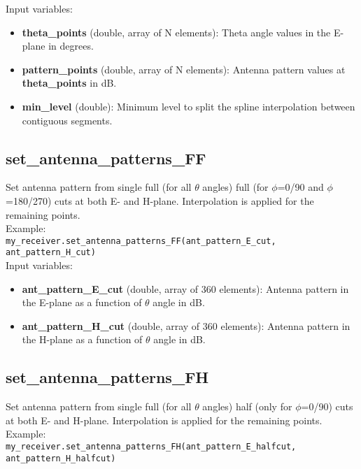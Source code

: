Input variables:
\begin{itemize}
\item {\bf theta\_points} (double, array of N elements): Theta angle values in the E-plane in degrees.
\item {\bf pattern\_points} (double, array of N elements): Antenna pattern values at {\bf theta\_points} in dB.
\item {\bf min\_level} (double): Minimum level to split the spline interpolation between contiguous segments.
\end{itemize}


\subsection{set\_antenna\_patterns\_FF}

Set antenna pattern from single full (for all $\theta$ angles) full (for $\phi$=0/90 and $\phi$=180/270) cuts at both E- and H-plane. Interpolation is applied for the remaining points.\\

Example:\\

\texttt{my\_receiver.set\_antenna\_patterns\_FF(ant\_pattern\_E\_cut, ant\_pattern\_H\_cut)}\\

Input variables:
\begin{itemize}
\item {\bf ant\_pattern\_E\_cut} (double, array of 360 elements): Antenna pattern in the E-plane as a function of $\theta$ angle in dB.
\item {\bf ant\_pattern\_H\_cut} (double, array of 360 elements): Antenna pattern in the H-plane as a function of $\theta$ angle in dB.
\end{itemize}


\subsection{set\_antenna\_patterns\_FH}

Set antenna pattern from single full (for all $\theta$ angles) half (only for $\phi$=0/90) cuts at both E- and H-plane. Interpolation is applied for the remaining points.\\

Example:\\

\texttt{my\_receiver.set\_antenna\_patterns\_FH(ant\_pattern\_E\_halfcut, ant\_pattern\_H\_halfcut)}\\


